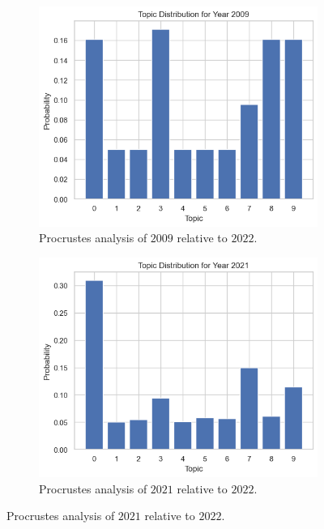 \newpage
\begin{figure}[H]
  \centering
  \begin{subfigure}[b]{0.45\textwidth}
    \includegraphics[width=\textwidth]{figures/procrustes/topics-2009.png}
    \caption{Procrustes analysis of $2009$ relative to $2022$.}
    \label{fig:procrustes-topics-2009}
  \end{subfigure}
  \hfill
  \begin{subfigure}[b]{0.45\textwidth}
    \includegraphics[width=\textwidth]{figures/procrustes/topics-2021.png}
    \caption{Procrustes analysis of $2021$ relative to $2022$.}

\end{subfigure}
\end{figure}
